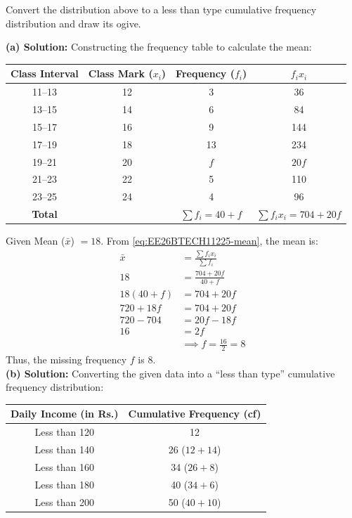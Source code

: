 \begin{enumerate}[label=\thesubsection.\arabic*, ref=\thesubsection.\theenumi]
\begin{enumerate}[label=(\alph*), leftmargin=1.5em, labelsep=0.5em]
Convert the distribution above to a less than type cumulative frequency distribution and draw its ogive.
    \end{enumerate}	\vspace{2pt}
    \noindent\textbf{(a) Solution:} Constructing the frequency table to calculate the mean:

\begin{center}
\begin{tabular}{|c|c|c|c|}
    \hline
    \textbf{Class Interval} & \textbf{Class Mark ($x_i$)} & \textbf{Frequency ($f_i$)} & \textbf{$f_i x_i$} \\
    \hline
    11--13 & 12 & 3 & 36 \\
    13--15 & 14 & 6 & 84 \\
    15--17 & 16 & 9 & 144 \\
    17--19 & 18 & 13 & 234 \\
    19--21 & 20 & $f$ & $20f$ \\
    21--23 & 22 & 5 & 110 \\
    23--25 & 24 & 4 & 96 \\
    \hline
    \textbf{Total} & & $\sum f_i = 40 + f$ & $\sum f_i x_i = 704 + 20f$ \\
    \hline
\end{tabular}
\end{center}

Given Mean ($\bar{x}$) $= 18$. From \eqref{eq:EE26BTECH11225-mean}, the mean is:
\begin{align}
    \bar{x} &= \frac{\sum f_i x_i}{\sum f_i} \\
    18 &= \frac{704 + 20f}{40 + f} \\
    18(40 + f) &= 704 + 20f \\
    720 + 18f &= 704 + 20f \\
    720 - 704 &= 20f - 18f \\
    16 &= 2f \\
    &\implies f = \frac{16}{2} = 8
\end{align}
Thus, the missing frequency $f$ is $8$. \\[8pt]
\noindent\textbf{(b) Solution:} Converting the given data into a ``less than type'' cumulative frequency distribution:

\begin{center}
\begin{tabular}{|c|c|}
    \hline
    \textbf{Daily Income (in Rs.)} & \textbf{Cumulative Frequency (cf)} \\
    \hline
    Less than 120 & 12 \\
    Less than 140 & 26 \quad ($12 + 14$) \\
    Less than 160 & 34 \quad ($26 + 8$) \\
    Less than 180 & 40 \quad ($34 + 6$) \\
    Less than 200 & 50 \quad ($40 + 10$) \\
    \hline
\end{tabular}
\end{center}


\end{enumerate}
